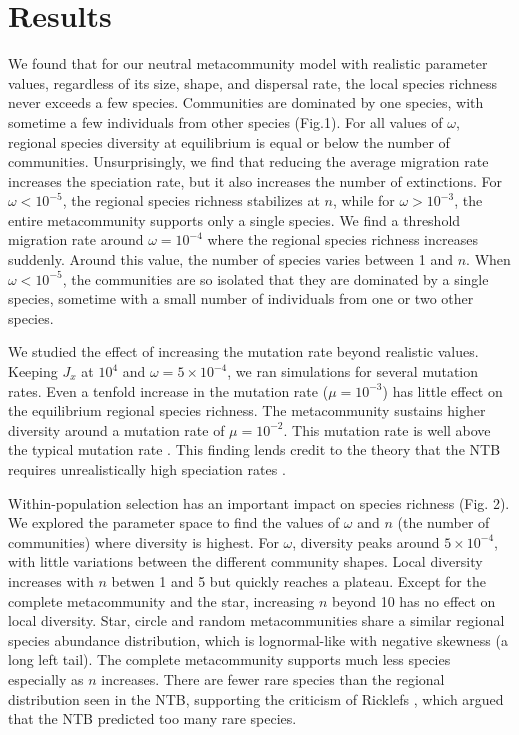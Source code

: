 \documentclass[letterpaper,twocolumn,superscriptaddress,showkeys]{revtex4}
\begin{document}
\section{Results}

We found that for our neutral metacommunity model with realistic parameter values, regardless of its size, shape, and dispersal rate, the local species richness never exceeds a few species. Communities are dominated by one species, with sometime a few individuals from other species (Fig.1). For all values of $\omega$, regional species diversity at equilibrium is equal or below the number of communities. Unsurprisingly, we find that reducing the average migration rate increases the speciation rate, but it also increases the number of extinctions. For $\omega < 10^{-5}$, the regional species richness stabilizes at $n$, while for $\omega > 10^{-3}$, the entire metacommunity supports only a single species. We find a threshold migration rate around $\omega = 10^{-4}$ where the regional species richness increases suddenly. Around this value, the number of species varies between 1 and $n$. When $\omega < 10^{-5}$, the communities are so isolated that they are dominated by a single species, sometime with a small number of individuals from one or two other species.

We studied the effect of increasing the mutation rate beyond realistic values. Keeping $J_x$ at $10^4$ and $\omega = 5\times 10^{-4}$, we ran simulations for several mutation rates. Even a tenfold increase in the mutation rate ($\mu = 10^{-3}$) has little effect on the equilibrium regional species richness. The metacommunity sustains higher diversity around a mutation rate of $\mu = 10^{-2}$. This mutation rate is well above the typical mutation rate \cite{dra98,gav04}. This finding lends credit to the theory that the NTB requires unrealistically high speciation rates \cite{ric03}.

Within-population selection has an important impact on species richness (Fig. 2). We explored the parameter space to find the values of $\omega$ and $n$ (the number of communities) where diversity is highest. For $\omega$, diversity peaks around $5\times 10^{-4}$, with little variations between the different community shapes. Local diversity increases with $n$ betwen 1 and 5 but quickly reaches a plateau. Except for the complete metacommunity and the star, increasing $n$ beyond 10 has no effect on local diversity. Star, circle and random metacommunities share a similar regional species abundance distribution, which is lognormal-like with negative skewness (a long left tail). The complete metacommunity supports much less species especially as $n$ increases. There are fewer rare species than the regional distribution seen in the NTB, supporting the criticism of Ricklefs \cite{ric03}, which argued that the NTB predicted too many rare species. 
\end{document}
